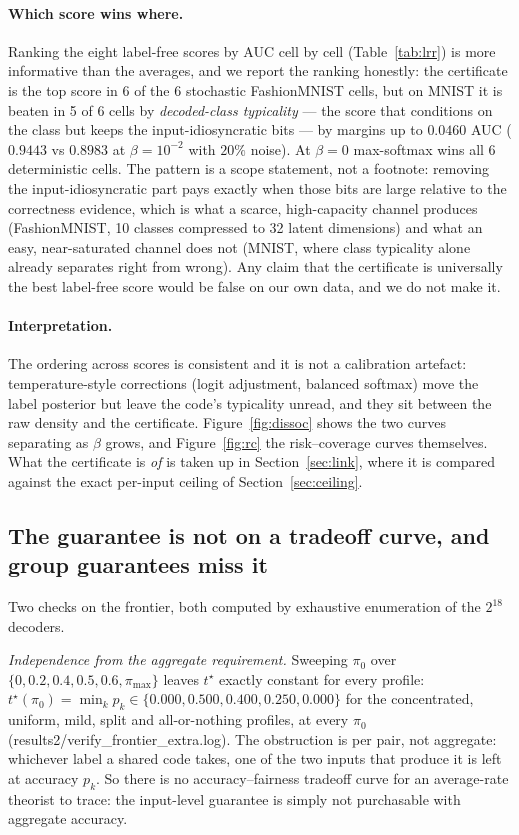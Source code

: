 \documentclass[11pt]{article}
\begin{document}
\paragraph{Which score wins where.} Ranking the eight label-free scores by AUC cell by cell
(Table~\ref{tab:lrr}) is more informative than the averages, and we report the ranking honestly:
the certificate is the top score in 6 of the 6
stochastic FashionMNIST cells, but on MNIST it is beaten in 5 of
6 cells by \emph{decoded-class typicality} --- the score that conditions on the class
but keeps the input-idiosyncratic bits --- by margins up to $0.0460$ AUC ($0.9443$ vs $0.8983$ at
$\beta=10^{-2}$ with $20\%$ noise). At $\beta=0$ max-softmax wins all 6 deterministic cells.
The pattern is a scope statement, not a footnote: removing the input-idiosyncratic part pays
exactly when those bits are large relative to the correctness evidence, which is what a scarce,
high-capacity channel produces (FashionMNIST, 10 classes compressed to 32 latent dimensions) and
what an easy, near-saturated channel does not (MNIST, where class typicality alone already
separates right from wrong). Any claim that the certificate is universally the best label-free
score would be false on our own data, and we do not make it.

\paragraph{Interpretation.} The ordering across scores is consistent and it is not a
calibration artefact: temperature-style corrections (logit adjustment, balanced softmax) move the
label posterior but leave the code's typicality unread, and they sit between the raw density and
the certificate. Figure~\ref{fig:dissoc} shows the two curves separating as $\beta$ grows, and
Figure~\ref{fig:rc} the risk--coverage curves themselves. What the certificate is \emph{of} is
taken up in Section~\ref{sec:link}, where it is compared against the exact per-input ceiling of
Section~\ref{sec:ceiling}.

\subsection{The guarantee is not on a tradeoff curve, and group guarantees miss it}
\label{sec:groups}
Two checks on the frontier, both computed by exhaustive enumeration of the $2^{18}$ decoders.

\emph{Independence from the aggregate requirement.} Sweeping $\pi_0$ over
$\{0,0.2,0.4,0.5,0.6,\pi_{\max}\}$ leaves $t^\star$ exactly constant for every profile:
$t^\star(\pi_0)=\min_k p_k\in\{0.000,0.500,0.400,0.250,0.000\}$ for the concentrated, uniform,
mild, split and all-or-nothing profiles, at every $\pi_0$ (results2/verify\_frontier\_extra.log).
The obstruction is per pair, not aggregate: whichever label a shared code takes, one of the two
inputs that produce it is left at accuracy $p_k$. So there is no accuracy--fairness tradeoff curve
for an average-rate theorist to trace: the input-level guarantee is simply not purchasable with
aggregate accuracy.
\end{document}
